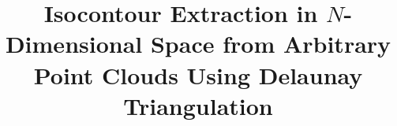 \title{Isocontour Extraction in $N$-Dimensional Space from Arbitrary Point
Clouds Using Delaunay Triangulation}
\author{}
\date{}

\newcommand{\PaperAbstract}{%
This paper extends the generalized isocontouring approach introduced by
\cite{OellerichBuescherDegel2023_1000162443} by proposing a more structured
and computationally efficient variant. While the original method utilized
arbitrary planes in three-dimensional space, the present approach restricts
the isocontouring process to hyperplanes normal to coordinate axes. Although
this reduces generality, it enables a systematic and scalable extension to
spaces of arbitrary dimensionality.}

\newif\ifshowbibliography
\showbibliographytrue
\newif\ifshowglossary
\showglossaryfalse
